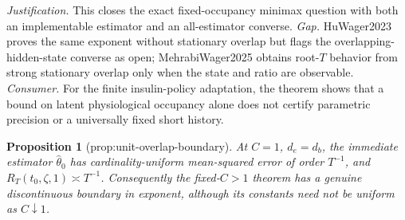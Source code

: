 \documentclass{article}
\newtheorem{proposition}{Proposition}
\begin{document}
\par\smallskip\noindent \textit{Justification.} This closes the exact fixed-occupancy minimax question with both an implementable estimator and an all-estimator converse. \textit{Gap.} HuWager2023 proves the same exponent without stationary overlap but flags the overlapping-hidden-state converse as open; MehrabiWager2025 obtains root-\(T\) behavior from strong stationary overlap only when the state and ratio are observable. \textit{Consumer.} For the finite insulin-policy adaptation, the theorem shows that a bound on latent physiological occupancy alone does not certify parametric precision or a universally fixed short history.

\begin{proposition}[prop:unit-overlap-boundary]\label{prop:unit-overlap-boundary}
At \(C=1\), \(d_e=d_b\), the immediate estimator \(\widehat\theta_0\) has cardinality-uniform mean-squared error of order \(T^{-1}\), and \(R_T(t_0,\zeta,1)\asymp T^{-1}\). Consequently the fixed-\(C>1\) theorem has a genuine discontinuous boundary in exponent, although its constants need not be uniform as \(C\downarrow1\).
\end{proposition}
\end{document}
